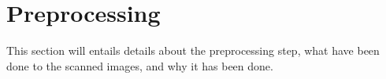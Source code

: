 \section{Preprocessing}
This section will entails details about the preprocessing step, what have been done to the scanned images, and why it has been done. 